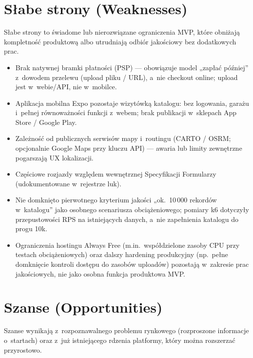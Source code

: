 \documentclass{sprz}
\begin{document}
\section{Słabe strony (Weaknesses)}
Słabe strony to świadome lub nierozwiązane ograniczenia MVP, które obniżają kompletność produktową albo utrudniają odbiór jakościowy bez dodatkowych prac.

\begin{itemize}
  \item Brak natywnej bramki płatności (PSP) --- obowiązuje model „zapłać później” z~dowodem przelewu (upload pliku / URL), a~nie checkout online; upload jest w~webie/API, nie w~mobilce.
  \item Aplikacja mobilna Expo pozostaje wizytówką katalogu: bez logowania, garażu i~pełnej równoważności funkcji z~webem; brak publikacji w~sklepach App Store / Google Play.
  \item Zależność od publicznych serwisów mapy i~routingu (CARTO / OSRM; opcjonalnie Google Maps przy kluczu API) --- awaria lub limity zewnętrzne pogarszają UX lokalizacji.
  \item Częściowe rozjazdy względem wewnętrznej Specyfikacji Formularzy
        (udokumentowane w~rejestrze luk).
  \item Nie domknięto pierwotnego kryterium jakości „ok.\ 10\,000 rekordów w~katalogu” jako osobnego scenariusza obciążeniowego; pomiary k6 dotyczyły przepustowości RPS na istniejących danych, a~nie zapełnienia katalogu do progu 10k.
  \item Ograniczenia hostingu Always Free (m.in.\ współdzielone zasoby CPU przy testach obciążeniowych) oraz dalszy hardening produkcyjny (np.\ pełne domknięcie kontroli dostępu do zasobów uploadów) pozostają w~zakresie prac jakościowych, nie jako osobna funkcja produktowa MVP.
\end{itemize}

\section{Szanse (Opportunities)}
Szanse wynikają z~rozpoznawalnego problemu rynkowego (rozproszone informacje o~startach) oraz z~już istniejącego rdzenia platformy, który można rozszerzać przyrostowo.
\end{document}
